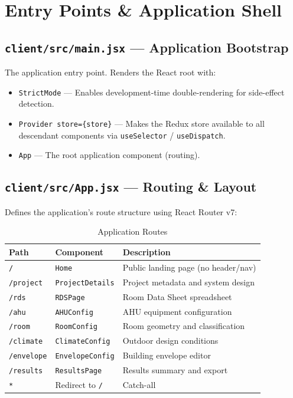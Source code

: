 \documentclass[12pt, a4paper, oneside]{report}
\newcommand{\file}[1]{\texttt{\textcolor{codeblue}{#1}}}
\newcommand{\code}[1]{\texttt{\textcolor{codered}{#1}}}
\begin{document}
\chapter{Entry Points \& Application Shell}

\section{\file{client/src/main.jsx} --- Application Bootstrap}

The application entry point. Renders the React root with:
\begin{itemize}
  \item \code{StrictMode} --- Enables development-time double-rendering for side-effect detection.
  \item \code{Provider store=\{store\}} --- Makes the Redux store available to all descendant components via \code{useSelector} / \code{useDispatch}.
  \item \code{App} --- The root application component (routing).
\end{itemize}

\section{\file{client/src/App.jsx} --- Routing \& Layout}

Defines the application's route structure using React Router v7:

\begin{table}[H]
\centering
\caption{Application Routes}
\begin{tabularx}{\textwidth}{llX}
\toprule
\textbf{Path} & \textbf{Component} & \textbf{Description} \\
\midrule
\texttt{/}         & \code{Home}            & Public landing page (no header/nav) \\
\texttt{/project}  & \code{ProjectDetails}  & Project metadata and system design \\
\texttt{/rds}      & \code{RDSPage}         & Room Data Sheet spreadsheet \\
\texttt{/ahu}      & \code{AHUConfig}       & AHU equipment configuration \\
\texttt{/room}     & \code{RoomConfig}      & Room geometry and classification \\
\texttt{/climate}  & \code{ClimateConfig}   & Outdoor design conditions \\
\texttt{/envelope} & \code{EnvelopeConfig}  & Building envelope editor \\
\texttt{/results}  & \code{ResultsPage}     & Results summary and export \\
\texttt{*}         & Redirect to \texttt{/} & Catch-all \\
\bottomrule
\end{tabularx}
\end{table}
\end{document}
